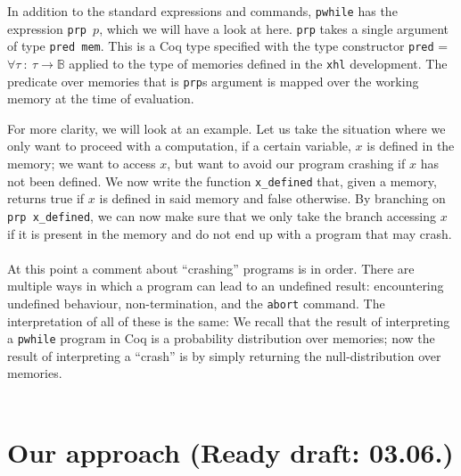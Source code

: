 \documentclass[11pt, leqno, titlepage]{article}
\theoremstyle{definition}
\begin{document}
In addition to the standard expressions and commands, \texttt{pwhile} has the
expression \texttt{prp $p$}, which we will have a look at here.
\texttt{prp} takes a single argument of type \texttt{pred mem}. This is a Coq type
specified with the type constructor \texttt{pred} = $\forall \tau~:~\tau \to
\mathbb{B}$ applied to the type of memories defined in the \texttt{xhl}
development. The predicate over memories that is \texttt{prp}s argument is mapped
over the working memory at the time of evaluation.

For more clarity, we will look at an example. Let us take the situation where we only
want to proceed with a computation, if a certain variable, $x$ is defined in the
memory; we want to access $x$, but want to avoid our program crashing if $x$ has not
been defined. We now write the function \texttt{x\_defined} that, given a memory,
returns true if $x$ is defined in said memory and false otherwise. By branching on
\texttt{prp x\_defined}, we can now make sure that we only take the branch accessing
$x$ if it is present in the memory and do not end up with a program that may
crash. \\
\\
At this point a comment about ``crashing'' programs is in order. There are multiple
ways in which a program can lead to an undefined result: encountering undefined
behaviour, non-termination, and the \texttt{abort} command. The interpretation of all
of these is the same: We recall that the result of interpreting a \texttt{pwhile}
program in Coq is a probability distribution over memories; now the result of
interpreting a ``crash'' is by simply returning the null-distribution over memories.\\
\\


\section{Our approach (Ready draft: 03.06.)}



\end{document}
